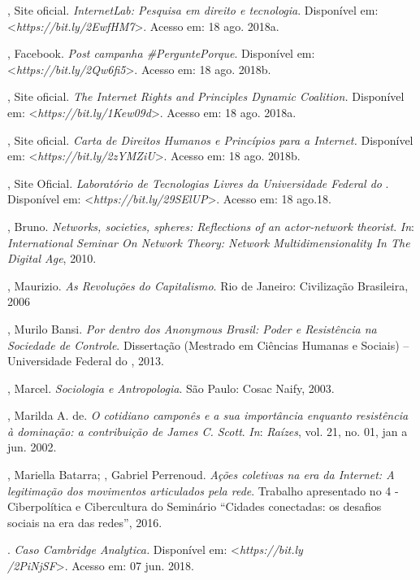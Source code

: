 \begin{Parskip}
, Site oficial. \emph{InternetLab: Pesquisa em direito e
tecnologia}. Disponível em: \textless{}\emph{https://bit.ly/2EwfHM7}\textgreater{}. Acesso em: 18 ago. 2018a.

, Facebook. \emph{Post campanha \#PerguntePorque}.
Disponível em: \textless{}\emph{https://bit.ly/2Qw6fi5}\textgreater{}. Acesso em: 18 ago. 2018b.

, Site oficial. \emph{The Internet Rights and Principles Dynamic
Coalition.} Disponível em: \textless{}\emph{https://bit.ly/1Kew09d}\textgreater{}. Acesso em: 18 ago. 2018a.

, Site oficial. \emph{Carta de Direitos Humanos e Princípios para
a Internet.} Disponível em: \textless{}\emph{https://bit.ly/2zYMZiU}\textgreater{}. Acesso em: 18 ago. 2018b.

, Site Oficial. \emph{Laboratório de Tecnologias Livres da
Universidade Federal do }. Disponível em: \textless{}\emph{https://bit.ly/29SElUP}\textgreater{}. Acesso em: 18 ago.18.

, Bruno. \emph{Networks, societies, spheres: Reflections of an
actor-network theorist}. \emph{In}: \emph{International Seminar On Network Theory:
Network Multidimensionality In The Digital Age}, 2010.

, Maurizio. \emph{As Revoluções do Capitalismo}. Rio de
Janeiro: Civilização Brasileira, 2006

, Murilo Bansi. \emph{Por dentro dos Anonymous Brasil: Poder e
Resistência na Sociedade de Controle}. Dissertação (Mestrado em Ciências
Humanas e Sociais) -- Universidade Federal do , 2013.

, Marcel. \emph{Sociologia e Antropologia}. São Paulo: Cosac
Naify, 2003.

, Marilda A. de. \emph{O cotidiano camponês e a sua importância enquanto
resistência à dominação: a contribuição de James C. Scott}. \emph{In}:
\emph{Raízes}, vol. 21, no. 01, jan a jun. 2002.

, Mariella Batarra; , Gabriel Perrenoud. \emph{Ações
coletivas na era da Internet: A legitimação dos movimentos articulados
pela rede}. Trabalho apresentado no  4 - Ciberpolítica e Cibercultura
do Seminário  ``Cidades conectadas: os desafios sociais na era das
redes'', 2016.

. \emph{Caso Cambridge Analytica.} Disponível em:
\textless{}\emph{https://bit.ly\\/2PiNjSF}\textgreater{}. Acesso em: 07 jun. 2018.


\end{Parskip}
